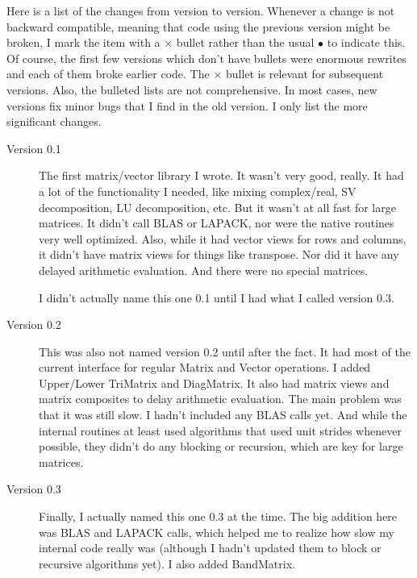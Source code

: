 \documentclass[twoside,letterpaper,11pt]{article}
\begin{document}
Here is a list of the changes from version to version.  Whenever a change 
is not backward compatible, meaning that code using the previous version
might be broken, I mark the item with a $\times$ bullet rather than the usual $\bullet$
to indicate this.  Of course, the first few versions which don't have bullets were
enormous rewrites and each of them broke earlier code.  The $\times$ bullet
is relevant for subsequent versions.  Also, the bulleted lists are not comprehensive.  
In most cases, new versions fix minor bugs that I find in the old version.  I only 
list the more significant changes.

\begin{description}
\item[Version 0.1]
The first matrix/vector library I wrote.  It wasn't very good, really. 
It had a lot of the functionality I needed, like mixing complex/real, 
SV decomposition, LU decomposition, etc.  But it wasn't at all fast for 
large matrices.  It didn't call BLAS or LAPACK, nor were the native routines
very well optimized.  Also, while it had vector views for rows and columns, 
it didn't have matrix views for things like transpose.  Nor did it have any
delayed arithmetic evaluation.  And there were no special matrices.

I didn't actually name this one 0.1 until I had what I called version 0.3.

\item[Version 0.2]
This was also not named version 0.2 until after the fact.  It had most of 
the current interface for regular Matrix and Vector operations.  I added
Upper/Lower TriMatrix and DiagMatrix.  It also had matrix views and
matrix composites to delay arithmetic evaluation.  The main problem was that
it was still slow.  I hadn't included any BLAS calls yet.  And while the 
internal routines at least used algorithms that used unit strides whenever 
possible, they didn't do any blocking or recursion, which are key for large
matrices.

\item[Version 0.3]
Finally, I actually named this one 0.3 at the time.
The big addition here was BLAS and LAPACK calls, which 
helped me to realize how slow my internal code really was (although I hadn't
updated them to block or recursive algorithms yet).
I also added BandMatrix.


\end{description}
\end{document}

